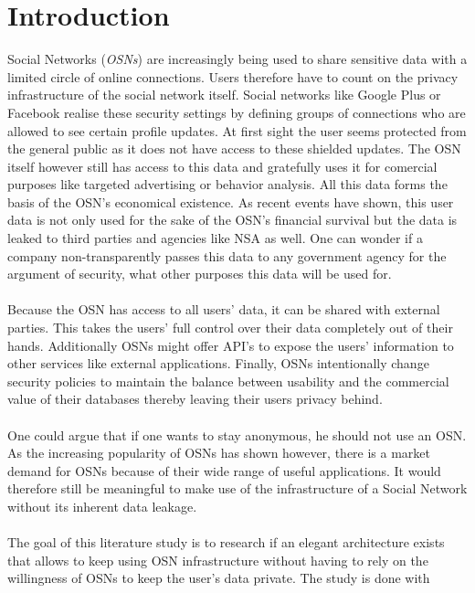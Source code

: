 \documentclass[journal]{IEEEtran}
\begin{document}
\section{Introduction} \label{sec:introduction}
 Social Networks (\textit{OSNs}) are increasingly being
used to share sensitive data with a limited circle of online connections. Users
therefore have to count on the privacy infrastructure of the social network
itself. Social networks like Google Plus or Facebook realise these security
settings by defining groups of connections who are allowed to see certain
profile updates. At first sight the user seems protected from the general public
as it does not have access to these shielded updates. The OSN itself however
still has access to this data and gratefully uses it for comercial purposes like
targeted advertising or behavior analysis. All this data forms the basis of the
OSN's economical existence. As recent events have shown, this user data is not
only used for the sake of the OSN's financial survival but the data is leaked to
third parties and agencies like NSA as well. One can wonder if a company
non-transparently passes this data to any government agency for the argument of
security, what other purposes this data will be used for.\\
\\
Because the OSN has access to all users' data, it can be shared with external
parties. This takes the users' full control over their data completely out of
their hands. Additionally OSNs might offer API's to expose the users'
information to other services like external applications. Finally, OSNs
intentionally change security policies to maintain the balance between
usability and the commercial value of their databases thereby leaving their
users privacy behind.~\cite{BeatoScramble}\\
\\
One could argue that if one wants to stay anonymous, he should not use an OSN.
As the increasing popularity of OSNs has shown however, there is a market
demand for OSNs because of their wide range of useful applications. It would
therefore still be meaningful to make use of the infrastructure of a Social
Network without its inherent data leakage.\\
\\
The goal of this literature study is to research if an elegant architecture
exists that allows to keep using OSN infrastructure without having to rely on
the  willingness of OSNs to keep the user's data private. The study is done with
\end{document}
